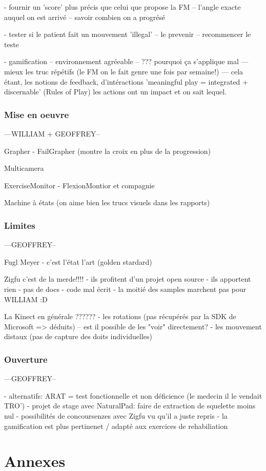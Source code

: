 \documentclass{report}
\begin{document}
		- fournir un 'score' plus précis que celui que propose la FM
		-- l'angle exacte auquel on est arrivé
		-- savoir combien on a progrésé
		
		- tester si le patient fait un mouvement 'illegal'
		-- le prevenir
		-- recommencer le teste
		
		
		- gamification
		-- environnement agréeable
		-- ??? pourquoi ça s'applique mal
		--- mieux les truc répétifs (le FM on le fait genre une fois par semaine!)
		--- cela étant, les notions de feedback, d'intéractions 
			'meaningful play = integrated + discernable' (Rules of Play) les actions ont un 
			impact et on sait lequel. 
		
		\section{Mise en oeuvre} 		---WILLIAM + GEOFFREY--

		Grapher
		- FailGrapher (montre la croix en plus de la progression)
		
		Multicamera
		
		ExerciseMonitor
		- FlexionMontior et compagnie
		
		Machine à états (on aime bien les trucs visuels dans les rapports)
		
		\section{Limites}		---GEOFFREY--
		
		Fugl Meyer
		- c'est l'état l'art (golden stardard)
		
		Zigfu c'est de la merde!!!!
		- ils profitent d'un projet open source
		- ils apportent rien
		- pas de docs
		- code mal écrit
		- la moitié des samples marchent pas pour WILLIAM :D
		
		La Kinect en générale ??????
		- les rotations (pas récupérés par la SDK de Microsoft => déduits)
		  -- est il possible de les "voir" directement?
		- les mouvement distaux (pas de capture des doits individuelles)
		
		\section{Ouverture}		---GEOFFREY--
		
		- alternatifs: ARAT = test fonctionnelle et non déficience (le medecin il le vendait TRO')
		- projet de stage avec NaturalPad: faire de extraction de squelette moins nul
		- possibilités de concoursenzes avec Zigfu vu qu'il a juste repris 
		- la gamification est plus pertinenet / adapté aux exercices de rehabiliation 
		
\part{Annexes}
\end{document}
